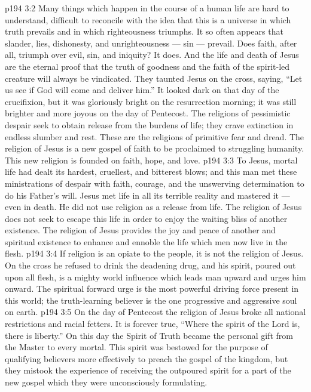 \vs p194 3:2 Many things which happen in the course of a human life are hard to understand, difficult to reconcile with the idea that this is a universe in which truth prevails and in which righteousness triumphs. It so often appears that slander, lies, dishonesty, and unrighteousness --- sin --- prevail. Does faith, after all, triumph over evil, sin, and iniquity? It does. And the life and death of Jesus are the eternal proof that the truth of goodness and the faith of the spirit\hyp{}led creature will always be vindicated. They taunted Jesus on the cross, saying, “Let us see if God will come and deliver him.” It looked dark on that day of the crucifixion, but it was gloriously bright on the resurrection morning; it was still brighter and more joyous on the day of Pentecost. The religions of pessimistic despair seek to obtain release from the burdens of life; they crave extinction in endless slumber and rest. These are the religions of primitive fear and dread. The religion of Jesus is a new gospel of faith to be proclaimed to struggling humanity. This new religion is founded on faith, hope, and love.
\vs p194 3:3 To Jesus, mortal life had dealt its hardest, cruellest, and bitterest blows; and this man met these ministrations of despair with faith, courage, and the unswerving determination to do his Father’s will. Jesus met life in all its terrible reality and mastered it --- even in death. He did not use religion as a release from life. The religion of Jesus does not seek to escape this life in order to enjoy the waiting bliss of another existence. The religion of Jesus provides the joy and peace of another and spiritual existence to enhance and ennoble the life which men now live in the flesh.
\vs p194 3:4 If religion is an opiate to the people, it is not the religion of Jesus. On the cross he refused to drink the deadening drug, and his spirit, poured out upon all flesh, is a mighty world influence which leads man upward and urges him onward. The spiritual forward urge is the most powerful driving force present in this world; the truth\hyp{}learning believer is the one progressive and aggressive soul on earth.
\vs p194 3:5 On the day of Pentecost the religion of Jesus broke all national restrictions and racial fetters. It is forever true, “Where the spirit of the Lord is, there is liberty.” On this day the Spirit of Truth became the personal gift from the Master to every mortal. This spirit was bestowed for the purpose of qualifying believers more effectively to preach the gospel of the kingdom, but they mistook the experience of receiving the outpoured spirit for a part of the new gospel which they were unconsciously formulating.
